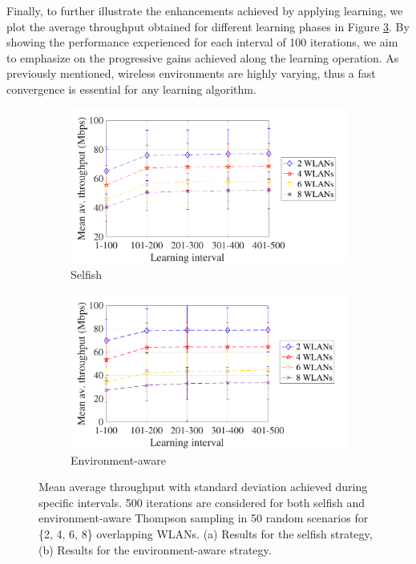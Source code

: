 \documentclass{article}
\begin{document}
Finally, to further illustrate the enhancements achieved by applying learning, we plot the average throughput obtained for different learning phases in Figure \ref{fig:cumulative_tpt}. By showing the performance experienced for each interval of 100 iterations, we aim to emphasize on the progressive gains achieved along the learning operation. As previously mentioned, wireless environments are highly varying, thus a fast convergence is essential for any learning algorithm.

\begin{figure}[h!]
	\centering
	\begin{subfigure}[b]{0.4\textwidth}
		\includegraphics[width=\textwidth]{scalability_selfish_learning_iterations}
		\caption{Selfish}
		\label{fig:scalability_selfish_accumulated}
	\end{subfigure}
	\begin{subfigure}[b]{0.4\textwidth}
		\includegraphics[width=\textwidth]{scalability_informed_learning_iterations}
		\caption{Environment-aware}
		\label{fig:scalability_informed_accumulated}
	\end{subfigure}
	\caption{Mean average throughput with standard deviation achieved during specific intervals. 500 iterations are considered for both selfish and environment-aware Thompson sampling in 50 random scenarios for \{2, 4, 6, 8\} overlapping WLANs. (a) Results for the selfish strategy, (b) Results for the environment-aware strategy.}
	\label{fig:cumulative_tpt}
\end{figure}
\end{document}
